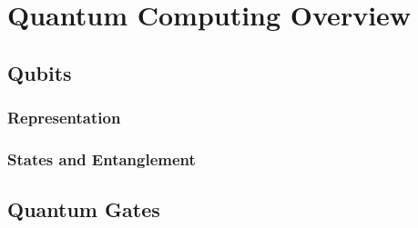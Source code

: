 \chapter{Quantum Computing Overview}

\section{Qubits}
\subsection{Representation}
\subsection{States and Entanglement}
\section{Quantum Gates}